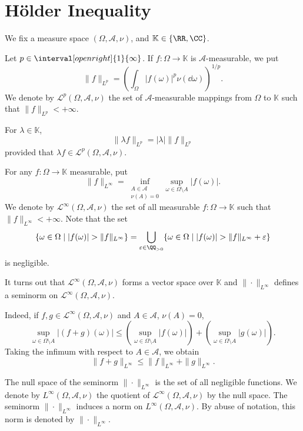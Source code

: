 \section{Hölder Inequality}
We fix a measure space $(\Omega,\mathscr{A},\nu)$, and $\mathbb{K} \in \{\RR,\CC\}$.

\begin{definitionenv}
    Let $p \in \interval[open right]{1}{\infty}$.
    If $f : \Omega \longrightarrow \mathbb{K}$ is $\mathscr{A}$-measurable, we put
    $$\|f\|_{L^{p}} = \left(\int_{\Omega} |f(\omega)|^p \nu(\dd \omega)\right)^{1/p}.$$
    We denote by $\mathcal{L}^{p}(\Omega,\mathscr{A},\nu)$ the set of $\mathscr{A}$-measurable mappings from $\Omega$ to $\mathbb{K}$ such that $\|f\|_{L^{p}} < + \infty$.

    \quad For $\lambda \in \mathbb{K}$,
    $$\|\lambda f\|_{L^{p}} = |\lambda| \|f\|_{L^{p}}$$
    provided that $\lambda f \in \mathcal{L}^{p}(\Omega,\mathscr{A},\nu)$.
\end{definitionenv}

\begin{definitionenv}
    For any $f : \Omega \longrightarrow \mathbb{K}$ measurable, put
    $$\|f\|_{L^{\infty}} = \inf_{\substack{A \in \mathscr{A}\\\nu(A) = 0}}\sup_{\omega \in \Omega \setminus A} |f(\omega)|.$$
    We denote by $\mathcal{L}^{\infty}(\Omega,\mathscr{A},\nu)$ the set of all measurable $f : \Omega \longrightarrow \mathbb{K}$ such that $\|f\|_{L^{\infty}} < +\infty$.
    Note that the set
    $$\{\omega \in \Omega \mid |f(\omega)| > \|f\|_{L^{\infty}}\} = \bigcup_{\varepsilon \in \QQ_{>0}}\{\omega \in \Omega \mid |f(\omega)| > \|f\|_{L^{\infty}} + \varepsilon\}$$
    is negligible.

    \quad It turns out that $\mathcal{L}^{\infty}(\Omega,\mathscr{A},\nu)$ forms a vector space over $\mathbb{K}$ and $\|\cdot\|_{L^{\infty}}$ defines a seminorm on $\mathcal{L}^{\infty}(\Omega,\mathscr{A},\nu).$

    \quad Indeed, if $f,g \in \mathcal{L}^{\infty}(\Omega,\mathscr{A},\nu)$ and $A \in \mathscr{A}$, $\nu(A) = 0$,
    $$\sup_{\omega \in \Omega\setminus A} |(f + g)(\omega)| \le (\sup_{\omega \in \Omega \setminus A}|f(\omega)|) + (\sup_{\omega \in \Omega \setminus A}|g(\omega)|).$$
    Taking the infimum with respect to $A \in \mathscr{A}$, we obtain
    $$\|f + g\|_{L^{\infty}} \le \|f\|_{L^{\infty}} + \|g\|_{L^{\infty}}.$$

    \quad The null space of the seminorm $\|\cdot\|_{L^{\infty}}$ is the set of all negligible functions.
    We denote by $L^{\infty}(\Omega,\mathscr{A},\nu)$ the quotient of $\mathcal{L}^{\infty}(\Omega,\mathscr{A},\nu)$ by the null space.
    The seminorm $\|\cdot\|_{L^{\infty}}$ induces a norm on $L^{\infty}(\Omega,\mathscr{A},\nu)$.
    By abuse of notation, this norm is denoted by $\|\cdot\|_{L^{\infty}}$.
\end{definitionenv}

